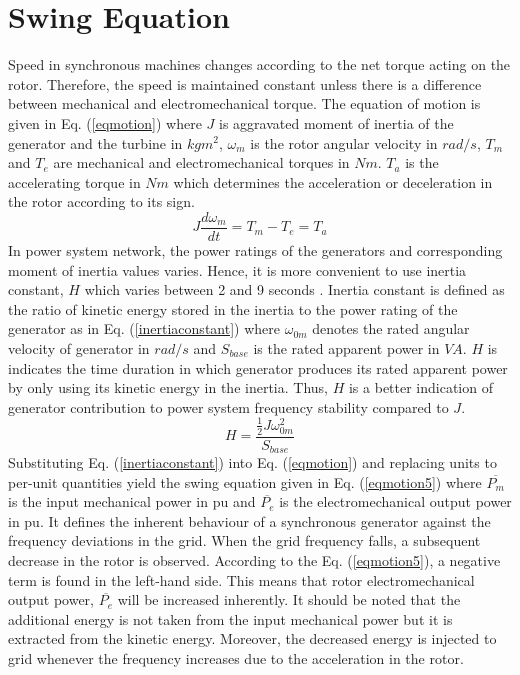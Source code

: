 \section{Swing Equation}
\label{swing}
Speed in synchronous machines changes according to the net torque acting on the rotor. Therefore, the speed is maintained constant unless there is a difference between mechanical and electromechanical torque. The equation of motion is given in Eq. (\ref{eqmotion}) where $J$ is aggravated moment of inertia of the generator and the turbine in $kgm^{2}$, $\omega_{m}$ is the rotor angular velocity in $rad/s$, $T_{m}$ and $T_{e}$ are mechanical and electromechanical torques in $Nm$. $T_{a}$ is the accelerating torque in $Nm$ which determines the acceleration or deceleration in the rotor according to its sign.
\begin{equation}
J\frac{d\omega_{m}}{dt}=T_{m}-T_{e}=T_{a}
\label{eqmotion}
\end{equation}
In power system network, the power ratings of the generators and corresponding moment of inertia values varies. Hence, it is more convenient to use inertia constant, $H$ which varies between 2 and 9 seconds \cite{Kundur}. Inertia constant is defined as the ratio of kinetic energy stored in the inertia to the power rating of the generator as in Eq. (\ref{inertiaconstant}) where $\omega_{0m}$ denotes the rated angular velocity of generator in $rad/s$ and $S_{base}$ is the rated apparent power in $VA$. $H$ is indicates the time duration in which generator produces its rated apparent power by only using its kinetic energy in the inertia. Thus, $H$ is a better indication of generator contribution to power system frequency stability compared to $J$.
\begin{equation}
H=\frac{{\frac{1}{2}}J\omega_{0m}^{2}}{S_{base}}
\label{inertiaconstant}
\end{equation}
Substituting Eq. (\ref{inertiaconstant}) into Eq. (\ref{eqmotion}) and replacing units to per-unit quantities yield the swing equation given in Eq. (\ref{eqmotion5}) where $\overline{P_{m}}$ is the input mechanical power in pu and $\overline{P_{e}}$ is the electromechanical output power in pu. It defines the inherent behaviour of a synchronous generator against the frequency deviations in the grid. When the grid frequency falls, a subsequent decrease in the rotor is observed. According to the Eq. (\ref{eqmotion5}), a negative term is found in the left-hand side. This means that rotor electromechanical output power, $\overline{P_{e}}$ will be increased inherently. It should be noted that the additional energy is not taken from the input mechanical power but it is extracted from the kinetic energy. Moreover, the decreased energy is injected to grid whenever the frequency increases due to the acceleration in the rotor.
